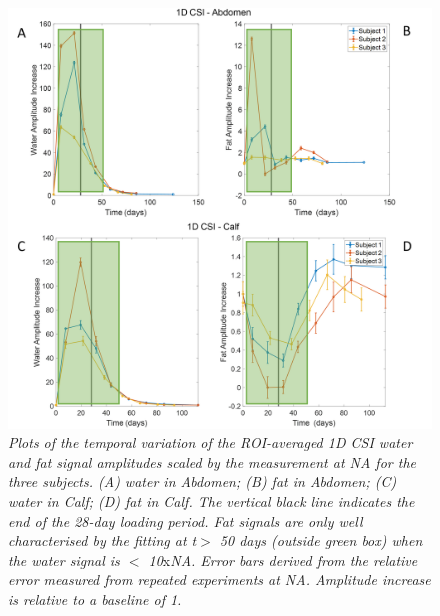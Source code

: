 \begin{figure}
    \centering
    \includegraphics[width=1\textwidth]{Figures/Lipid/1DCSI_Amplitude.png}
    \caption{\textit{Plots of the temporal variation of the \ac{ROI}-averaged 1D \ac{CSI} water and fat signal amplitudes scaled by the measurement at NA for the three subjects. (A) water in Abdomen; (B) fat in Abdomen; (C) water in Calf; (D) fat in Calf. The vertical black line indicates the end of the 28-day loading period. Fat signals are only well characterised by the fitting at t$>$ 50 days (outside green box) when the water signal is $<$ 10}x\textit{\ac{NA}.  Error bars derived from the relative error measured from repeated experiments at NA. Amplitude increase is relative to a baseline of 1.}}
    \label{fig:Lip:1DCSI}
\end{figure}

